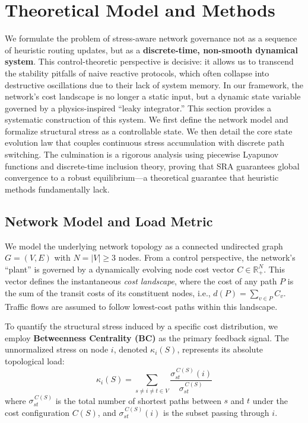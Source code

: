 \documentclass{ccjnl}
\begin{document}
\section{Theoretical Model and Methods}
\label{sec:model}

We formulate the problem of stress-aware network governance not as a sequence of heuristic routing updates, but as a \textbf{discrete-time, non-smooth dynamical system}. 
This control-theoretic perspective is decisive: it allows us to transcend the stability pitfalls of naive reactive protocols, which often collapse into destructive oscillations due to their lack of system memory.
In our framework, the network's cost landscape is no longer a static input, but a dynamic state variable governed by a physics-inspired ``leaky integrator.''
This section provides a systematic construction of this system. 
We first define the network model and formalize structural stress as a controllable state. 
We then detail the core state evolution law that couples continuous stress accumulation with discrete path switching. 
The culmination is a rigorous analysis using piecewise Lyapunov functions and discrete-time inclusion theory, proving that SRA guarantees global convergence to a robust equilibrium---a theoretical guarantee that heuristic methods fundamentally lack.

\subsection{Network Model and Load Metric}

We model the underlying network topology as a connected undirected graph $G=(V,E)$ with $N=|V| \ge 3$ nodes. 
From a control perspective, the network's ``plant'' is governed by a dynamically evolving node cost vector $C \in \mathbb{R}^N_+$. 
This vector defines the instantaneous \textit{cost landscape}, where the cost of any path $P$ is the sum of the transit costs of its constituent nodes, i.e., $d(P) = \sum_{v \in P} C_v$. 
Traffic flows are assumed to follow lowest-cost paths within this landscape.

To quantify the structural stress induced by a specific cost distribution, we employ \textbf{Betweenness Centrality (BC)} as the primary feedback signal. 
The unnormalized stress on node $i$, denoted $\kappa_i(S)$, represents its absolute topological load:
\begin{equation}
    \label{eq:bc_definition}
    \kappa_i(S) = \sum_{s\neq i\neq t\in V} \frac{\sigma^{\,C(S)}_{st}(i)}{\sigma^{\,C(S)}_{st}}
\end{equation}
where $\sigma^{\,C(S)}_{st}$ is the total number of shortest paths between $s$ and $t$ under the cost configuration $C(S)$, and $\sigma^{\,C(S)}_{st}(i)$ is the subset passing through $i$.
\end{document}
